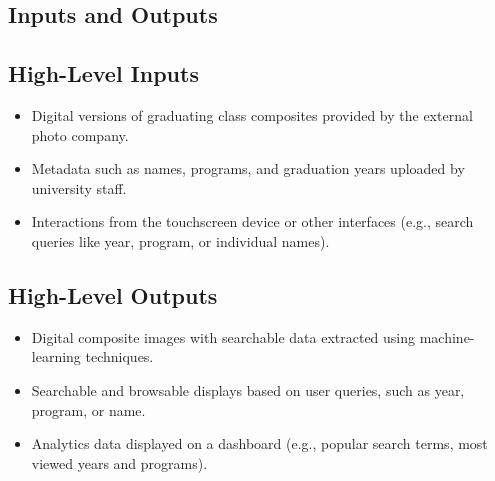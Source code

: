 \documentclass{article}
\begin{document}
\subsection{Inputs and Outputs}

\subsection*{High-Level Inputs}
\begin{itemize}
    \item Digital versions of graduating class composites provided by the external photo company.
    \item Metadata such as names, programs, and graduation years uploaded by university staff.
    \item Interactions from the touchscreen device or other interfaces (e.g., search queries like year, program, or individual names).
\end{itemize}

\subsection*{High-Level Outputs}
\begin{itemize}
    \item Digital composite images with searchable data extracted using machine-learning techniques.
    \item Searchable and browsable displays based on user queries, such as year, program, or name.
    \item Analytics data displayed on a dashboard (e.g., popular search terms, most viewed years and programs).

\end{itemize}
\end{document}
